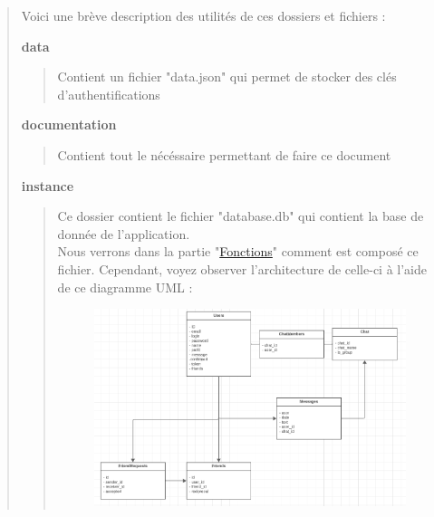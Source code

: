 \documentclass{article}
\begin{document}
\begin{quote}

    Voici une brève description des utilités de ces dossiers et fichiers :
    
    \vspace*{1\baselineskip}
    \large{\textbf{data}}

    \begin{quote}
        Contient un fichier "data.json" qui permet de stocker des clés d'authentifications
    \end{quote}

    \vspace*{1\baselineskip}
    \large{\textbf{documentation}}

    \begin{quote}
        Contient tout le nécéssaire permettant de faire ce document
    \end{quote}

    \vspace*{1\baselineskip}
    \large{\textbf{instance}}

    \begin{quote}
        Ce dossier contient le fichier "database.db" qui contient la base de donnée de l'application. \\
        Nous verrons dans la partie "\hyperref[sec:partieFonctions]{Fonctions}" comment est composé ce fichier.
        Cependant, voyez observer l'architecture de celle-ci à l'aide de ce diagramme UML : 
        
        \begin{center}
            \begin{figure}[h]
                \includegraphics[width=\textwidth]{image/SQL.png}
            \end{figure}
        \end{center}


\end{quote}
\end{quote}
\end{document}
